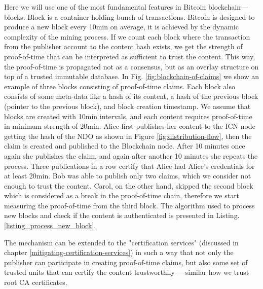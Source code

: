 Here we will use one of the most fundamental features in Bitcoin blockchain––blocks. Block is a container holding bunch of transactions. Bitcoin is designed to produce a new block every 10min on average, it is achieved by the dynamic complexity of the mining process. If we count each block where the transaction from the publisher account to the content hash exists, we get the strength of proof-of-time that can be interpreted as sufficient to trust the content. This way, the proof-of-time is propagated not as a consensus, but as an overlay structure on top of a trusted immutable database. In Fig. \ref{fig:blockchain-of-claims} we show an example of three blocks consisting of proof-of-time claims. Each block also consists of some meta-data like a hash of its content, a hash of the previous block (pointer to the previous block), and block creation timestamp. We assume that blocks are created with 10min intervals, and each content requires proof-of-time in minimum strength of 20min. Alice first publishes her content to the ICN node getting the hash of the NDO as shown in Figure \ref{fig:distribution-flow}, then the claim is created and published to the Blockchain node. After 10 minutes once again she publishes the claim, and again after another 10 minutes she repeats the process. Three publications in a row certify that Alice had Alice's credentials for at least 20min. Bob was able to publish only two claims, which we consider not enough to trust the content. Carol, on the other hand, skipped the second block which is considered as a break in the proof-of-time chain, therefore we start measuring the proof-of-time from the third block. The algorithm used to process new blocks and check if the content is authenticated is presented in Listing. \ref{listing_process_new_block}.

The mechanism can be extended to the "certification services" (discussed in chapter \ref{mitigating-certification-services}) in such a way that not only the publisher can participate in creating proof-of-time claims, but also some set of trusted units that can certify the content trustworthily–––similar how we trust root CA certificates. 

